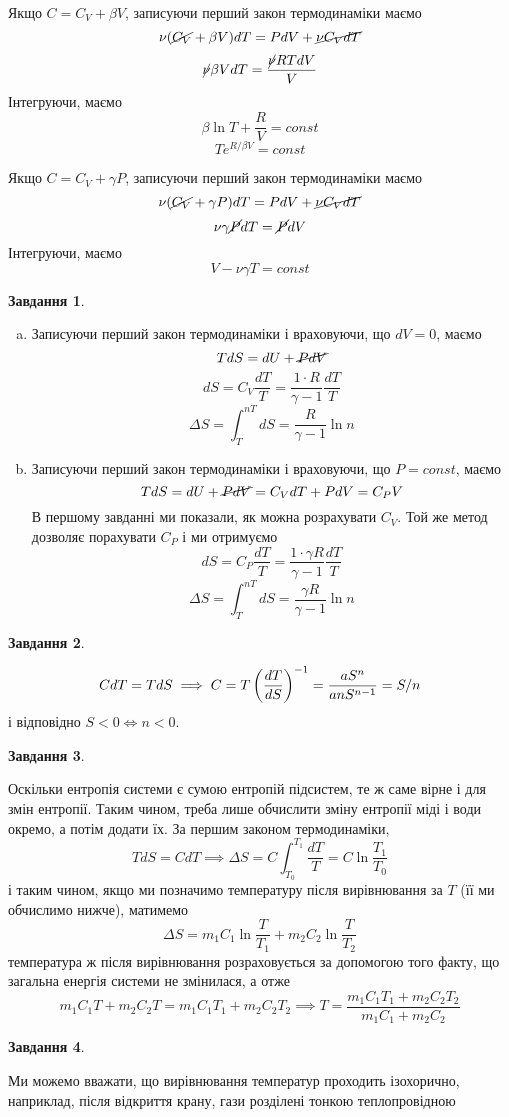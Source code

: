 \documentclass[12pt]{article} %
\newtheorem{prob}{Завдання}
\begin{document}
	Якщо $C=C_V+\beta V$, записуючи перший закон термодинаміки маємо
	\[\nu (\cancel{C_V}+\beta V)dT=PdV+\cancel{\nu C_VdT}\]
	\[\cancel{\nu}\beta VdT=\frac{\cancel{\nu}RTdV}{V}\]
	Інтегруючи, маємо
	\[\beta\ln T+\frac{R}{V}=const\]
	\[Te^{R/\beta V}=const\]

	Якщо $C=C_V+\gamma P$, записуючи перший закон термодинаміки маємо
	\[\nu (\cancel{C_V}+\gamma P)dT=PdV+\cancel{\nu C_VdT}\]
	\[\nu\gamma \cancel{P}dT=\cancel{P}dV\]
	Інтегруючи, маємо
	\[V-\nu\gamma T=const\]
	\setcounter{prob}{0}
\begin{prob}\end{prob}%
	\begin{enumerate}[a)]
		\item Записуючи перший закон термодинаміки і враховуючи, що $dV=0$, маємо
			\[TdS=dU+\cancel{PdV}\]
			\[dS=C_V\frac{dT}{T}=\frac{1\cdot R}{\gamma-1}\frac{dT}{T}\]
			\[\Delta S=\int_T^{nT}dS=\frac{R}{\gamma-1}\ln n\]
		\item Записуючи перший закон термодинаміки і враховуючи, що $P=const$, маємо
			\[TdS=dU+\cancel{PdV}=C_VdT+PdV=C_PV\]
			В першому завданні ми показали, як можна розрахувати $C_V$. Той же метод дозволяє порахувати $C_P$ і ми отримуємо
			\[dS=C_P\frac{dT}{T}=\frac{1\cdot\gamma R}{\gamma-1}\frac{dT}{T}\]
			\[\Delta S=\int_T^{nT}dS=\frac{\gamma R}{\gamma-1}\ln n\]
	\end{enumerate}
\begin{prob}\end{prob}%
	\[CdT=TdS\implies C=T\left(\frac{dT}{dS}\right)^{-1}=\frac{aS^n}{anS^{n-1}}=S/n\]
	і відповідно $S<0\iff n<0$.
\begin{prob}\end{prob}%
	Оскільки ентропія системи є сумою ентропій підсистем, те ж саме вірне і для змін ентропії. Таким чином, треба лише обчислити
	зміну ентропії міді і води окремо, а потім додати їх. За першим законом термодинаміки,
	\[TdS=CdT\implies \Delta S=C\int_{T_0}^{T_1}\frac{dT}{T}=C\ln\frac{T_1}{T_0}\]
	і таким чином, якщо ми позначимо температуру після вирівнювання за $T$ (її ми обчислимо нижче), матимемо
	\[\Delta S=m_1C_1\ln\frac{T}{T_1}+m_2C_2\ln\frac{T}{T_2}\]
	температура ж після вирівнювання розраховується за допомогою того факту, що загальна енергія системи не змінилася, а отже
	\[m_1C_1T+m_2C_2T=m_1C_1T_1+m_2C_2T_2\implies T=\frac{m_1C_1T_1+m_2C_2T_2}{m_1C_1+m_2C_2}\]
\begin{prob}\end{prob}%
	Ми можемо вважати, що вирівнювання температур проходить ізохорично, наприклад, після відкриття крану, гази розділені тонкою теплопровідною
\end{document}
